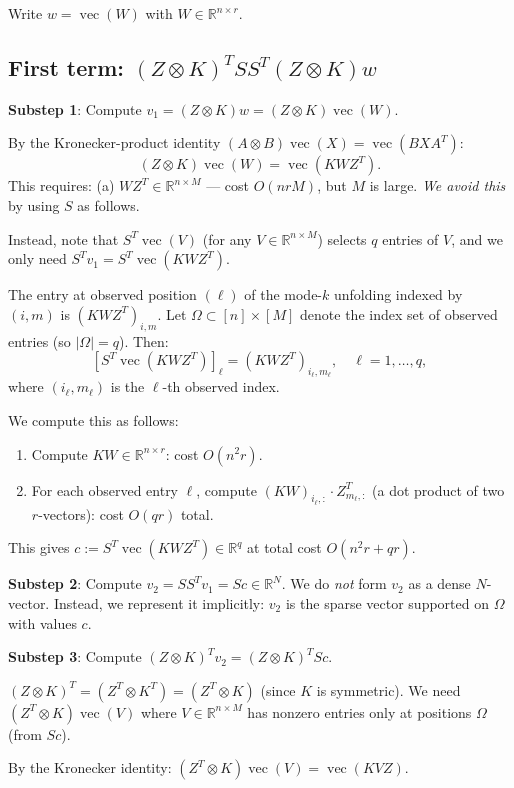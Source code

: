 \documentclass[12pt]{article}
\theoremstyle{definition}
\theoremstyle{remark}
\DeclareMathOperator{\vecop}{vec}
\begin{document}
Write $w = \vecop(W)$ with $W\in\mathbb{R}^{n\times r}$.

\subsection{First term: $(Z\otimes K)^T S S^T (Z\otimes K) w$}

\textbf{Substep 1}: Compute $v_1 = (Z\otimes K)w = (Z\otimes K)\vecop(W)$.

By the Kronecker-product identity $(A\otimes B)\vecop(X) = \vecop(BXA^T)$:
\[
  (Z\otimes K)\vecop(W) = \vecop(KWZ^T).
\]
This requires: (a) $WZ^T\in\mathbb{R}^{n\times M}$ — cost $O(nrM)$, but
$M$ is large.  \emph{We avoid this} by using $S$ as follows.

Instead, note that $S^T\vecop(V)$ (for any $V\in\mathbb{R}^{n\times M}$)
selects $q$ entries of $V$, and we only need $S^T v_1 = S^T\vecop(KWZ^T)$.

The entry at observed position $(\ell)$ of the mode-$k$ unfolding indexed
by $(i,m)$ is $(KWZ^T)_{i,m}$.  Let $\Omega\subset[n]\times[M]$ denote
the index set of observed entries (so $|\Omega|=q$).  Then:
\[
  [S^T\vecop(KWZ^T)]_\ell = (KWZ^T)_{i_\ell,m_\ell}, \quad \ell=1,\dots,q,
\]
where $(i_\ell,m_\ell)$ is the $\ell$-th observed index.

We compute this as follows:
\begin{enumerate}
\item Compute $KW\in\mathbb{R}^{n\times r}$: cost $O(n^2r)$.
\item For each observed entry $\ell$, compute $(KW)_{i_\ell,:}\cdot Z_{m_\ell,:}^T$
  (a dot product of two $r$-vectors): cost $O(qr)$ total.
\end{enumerate}
This gives $c := S^T\vecop(KWZ^T)\in\mathbb{R}^q$ at total cost $O(n^2r + qr)$.

\textbf{Substep 2}: Compute $v_2 = SS^Tv_1 = Sc\in\mathbb{R}^N$.
We do \emph{not} form $v_2$ as a dense $N$-vector.  Instead, we represent
it implicitly: $v_2$ is the sparse vector supported on $\Omega$ with values $c$.

\textbf{Substep 3}: Compute $(Z\otimes K)^T v_2 = (Z\otimes K)^T Sc$.

$(Z\otimes K)^T = (Z^T\otimes K^T) = (Z^T\otimes K)$ (since $K$ is symmetric).
We need $(Z^T\otimes K)\vecop(V)$ where $V\in\mathbb{R}^{n\times M}$ has
nonzero entries only at positions $\Omega$ (from $Sc$).

By the Kronecker identity:
$(Z^T\otimes K)\vecop(V) = \vecop(KVZ)$.
\end{document}
